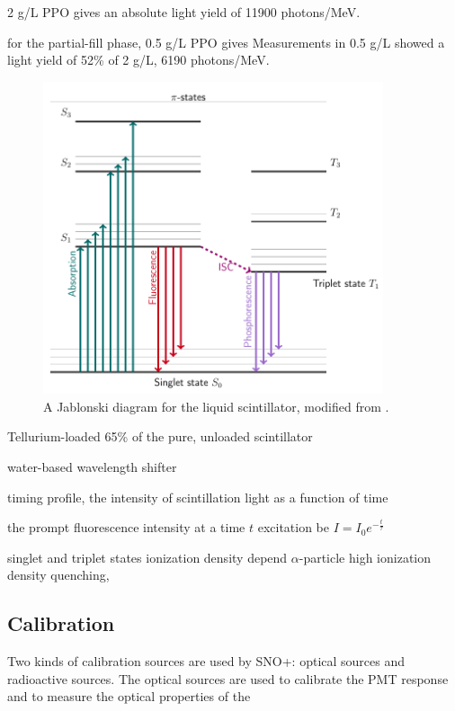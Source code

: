 2 g/L PPO gives an absolute light yield of 11900 photons/MeV.


for the partial-fill phase, 0.5 g/L PPO gives Measurements in 0.5 g/L showed a light yield of 52\% of 2 g/L,  
6190 photons/MeV\cite{joshW1,tanner0p5}.

	
\begin{figure}[!htb]
	\centering
	\includegraphics[width=10cm]{jablonski.png}
	\caption{A Jablonski diagram for the liquid scintillator, modified from \cite{knoll2010radiation,birks1965theory}.}
	\label{jablonski}
\end{figure}




Tellurium-loaded 65\% of the pure, unloaded scintillator



water-based wavelength shifter


timing profile, the intensity of scintillation light as a function of time

the prompt fluorescence intensity at a time $t$ excitation be $I=I_0e^{-\frac{t}{\tau}}$



singlet and triplet states 
ionization density 
depend
$\alpha$-particle
high ionization density 
quenching, 


\subsection{Calibration}


Two kinds of calibration sources are used by SNO+: optical sources and radioactive sources. 
The optical sources are used to calibrate the PMT response and to measure the optical properties of the 



